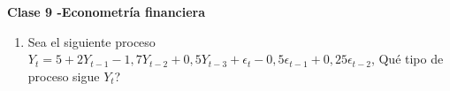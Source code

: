 \documentclass[12pt,letterpaper]{article}
\begin{document}
\begin{center}
\large\textbf{Clase 9 -Econometr\'ia financiera}
\end{center}

\begin{enumerate}
\item Sea el siguiente proceso $Y_t = 5 + 2 Y_{t-1} -1,7 Y_{t-2} + 0,5 Y_{t-3} + \epsilon_t - 0,5 \epsilon_{t-1} + 0,25 \epsilon_{t-2}$, Qu\'e tipo de proceso sigue $Y_t$?


\end{enumerate}
\end{document}

